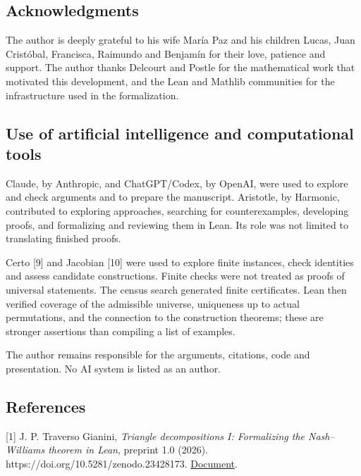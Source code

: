 \documentclass[english,11pt,a4paper]{article}
\begin{document}
\subsection{Acknowledgments}\label{acknowledgments}

The author is deeply grateful to his wife María Paz and his children Lucas, Juan Cristóbal, Francisca, Raimundo and Benjamín for their love, patience and support. The author thanks Delcourt and Postle for the mathematical work that motivated this development, and the Lean and Mathlib communities for the infrastructure used in the formalization.

\subsection{Use of artificial intelligence and computational tools}\label{use-of-artificial-intelligence-and-computational-tools}

Claude, by Anthropic, and ChatGPT/Codex, by OpenAI, were used to explore and check arguments and to prepare the manuscript. Aristotle, by Harmonic, contributed to exploring approaches, searching for counterexamples, developing proofs, and formalizing and reviewing them in Lean. Its role was not limited to translating finished proofs.

Certo {[}9{]} and Jacobian {[}10{]} were used to explore finite instances, check identities and assess candidate constructions. Finite checks were not treated as proofs of universal statements. The census search generated finite certificates. Lean then verified coverage of the admissible universe, uniqueness up to actual permutations, and the connection to the construction theorems; these are stronger assertions than compiling a list of examples.

The author remains responsible for the arguments, citations, code and presentation. No AI system is listed as an author.

\subsection{References}\label{references}

\begingroup\small\raggedright
\setlength{\parskip}{3pt}

{[}1{]} J. P. Traverso Gianini, \emph{Triangle decompositions I: Formalizing the Nash--Williams theorem in Lean}, preprint 1.0 (2026). https://doi.org/10.5281/zenodo.23428173. \href{https://github.com/jtraverso/nash-williams-triangle-decompositions/blob/main/preprints/PAPER_I/01_manuscript/PAPER_I_preprint_v1.0_en.md}{Document}.
\end{document}
